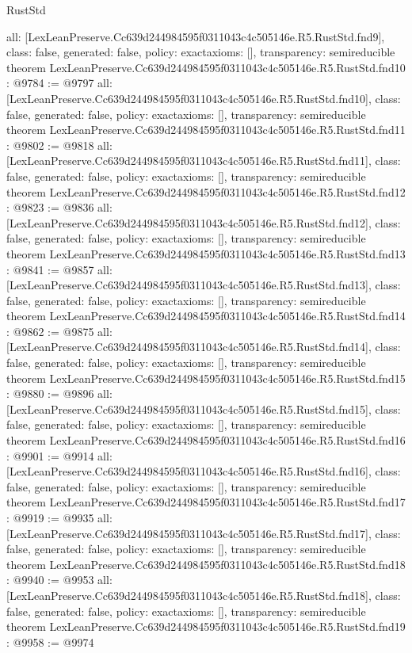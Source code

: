 \begin{lexlean}{RustStd}
\begin{coremodule}
{  all: [LexLeanPreserve.Cc639d244984595f0311043c4c505146e.R5.RustStd.fnd9],
  class: false,
  generated: false,
  policy: exact{axioms: []},
  transparency: semireducible
}
theorem LexLeanPreserve.Cc639d244984595f0311043c4c505146e.R5.RustStd.fnd10 : @9784 := @9797 {
  all: [LexLeanPreserve.Cc639d244984595f0311043c4c505146e.R5.RustStd.fnd10],
  class: false,
  generated: false,
  policy: exact{axioms: []},
  transparency: semireducible
}
theorem LexLeanPreserve.Cc639d244984595f0311043c4c505146e.R5.RustStd.fnd11 : @9802 := @9818 {
  all: [LexLeanPreserve.Cc639d244984595f0311043c4c505146e.R5.RustStd.fnd11],
  class: false,
  generated: false,
  policy: exact{axioms: []},
  transparency: semireducible
}
theorem LexLeanPreserve.Cc639d244984595f0311043c4c505146e.R5.RustStd.fnd12 : @9823 := @9836 {
  all: [LexLeanPreserve.Cc639d244984595f0311043c4c505146e.R5.RustStd.fnd12],
  class: false,
  generated: false,
  policy: exact{axioms: []},
  transparency: semireducible
}
theorem LexLeanPreserve.Cc639d244984595f0311043c4c505146e.R5.RustStd.fnd13 : @9841 := @9857 {
  all: [LexLeanPreserve.Cc639d244984595f0311043c4c505146e.R5.RustStd.fnd13],
  class: false,
  generated: false,
  policy: exact{axioms: []},
  transparency: semireducible
}
theorem LexLeanPreserve.Cc639d244984595f0311043c4c505146e.R5.RustStd.fnd14 : @9862 := @9875 {
  all: [LexLeanPreserve.Cc639d244984595f0311043c4c505146e.R5.RustStd.fnd14],
  class: false,
  generated: false,
  policy: exact{axioms: []},
  transparency: semireducible
}
theorem LexLeanPreserve.Cc639d244984595f0311043c4c505146e.R5.RustStd.fnd15 : @9880 := @9896 {
  all: [LexLeanPreserve.Cc639d244984595f0311043c4c505146e.R5.RustStd.fnd15],
  class: false,
  generated: false,
  policy: exact{axioms: []},
  transparency: semireducible
}
theorem LexLeanPreserve.Cc639d244984595f0311043c4c505146e.R5.RustStd.fnd16 : @9901 := @9914 {
  all: [LexLeanPreserve.Cc639d244984595f0311043c4c505146e.R5.RustStd.fnd16],
  class: false,
  generated: false,
  policy: exact{axioms: []},
  transparency: semireducible
}
theorem LexLeanPreserve.Cc639d244984595f0311043c4c505146e.R5.RustStd.fnd17 : @9919 := @9935 {
  all: [LexLeanPreserve.Cc639d244984595f0311043c4c505146e.R5.RustStd.fnd17],
  class: false,
  generated: false,
  policy: exact{axioms: []},
  transparency: semireducible
}
theorem LexLeanPreserve.Cc639d244984595f0311043c4c505146e.R5.RustStd.fnd18 : @9940 := @9953 {
  all: [LexLeanPreserve.Cc639d244984595f0311043c4c505146e.R5.RustStd.fnd18],
  class: false,
  generated: false,
  policy: exact{axioms: []},
  transparency: semireducible
}
theorem LexLeanPreserve.Cc639d244984595f0311043c4c505146e.R5.RustStd.fnd19 : @9958 := @9974 {
}
\end{coremodule}
\end{lexlean}
